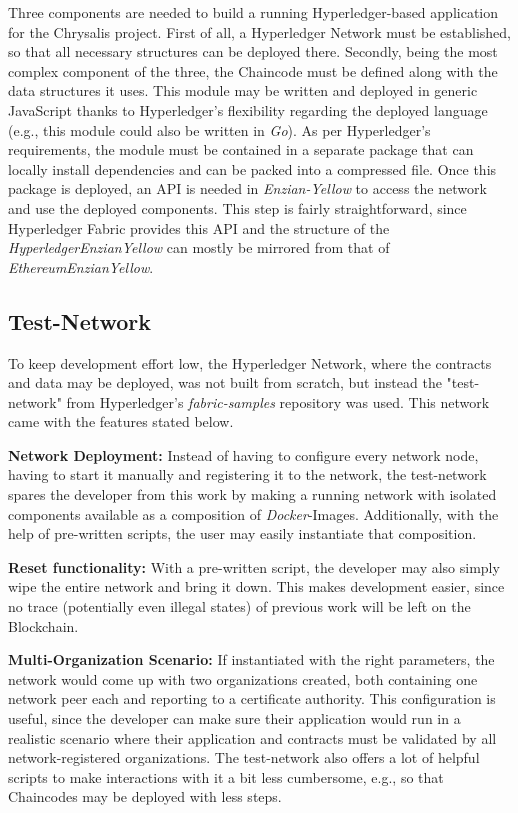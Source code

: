 Three components are needed to build a running Hyperledger-based application for the Chrysalis project. \newline
First of all, a Hyperledger Network must be established, so that all necessary structures can be deployed there. Secondly, being the most complex component of the three, the Chaincode must be defined along with the data structures it uses. This module may be written and deployed in generic JavaScript thanks to Hyperledger's flexibility regarding the deployed language (e.g., this module could also be written in \emph{Go}). As per Hyperledger's requirements, the module must be contained in a separate package that can locally install dependencies and can be packed into a compressed file. Once this package is deployed, an API is needed in \emph{Enzian-Yellow} to access the network and use the deployed components. This step is fairly straightforward, since Hyperledger Fabric provides this API and the structure of the \emph{HyperledgerEnzianYellow} can mostly be mirrored from that of \emph{EthereumEnzianYellow}.

\subsection{Test-Network}
\label{sec:impr:hl:network}

To keep development effort low, the Hyperledger Network, where the contracts and data may be deployed, was not built from scratch, but instead the "test-network" from Hyperledger's \emph{fabric-samples} repository was used. This network came with the features stated below.

\textbf{Network Deployment:} Instead of having to configure every network node, having to start it manually and registering it to the network, the test-network spares the developer from this work by making a running network with isolated components available as a composition of \emph{Docker}-Images. Additionally, with the help of pre-written scripts, the user may easily instantiate that composition.

\textbf{Reset functionality:} With a pre-written script, the developer may also simply wipe the entire network and bring it down. This makes development easier, since no trace (potentially even illegal states) of previous work will be left on the Blockchain.

\textbf{Multi-Organization Scenario:} If instantiated with the right parameters, the network would come up with two organizations created, both containing one network peer each and reporting to a certificate authority. This configuration is useful, since the developer can make sure their application would run in a realistic scenario where their application and contracts must be validated by all network-registered organizations. The test-network also offers a lot of helpful scripts to make interactions with it a bit less cumbersome, e.g., so that Chaincodes may be deployed with less steps.

